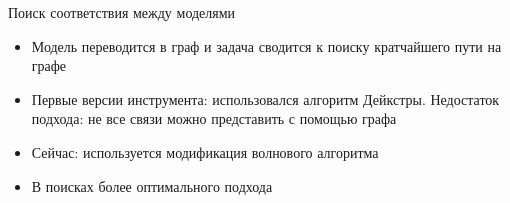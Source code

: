 \documentclass[12pt]{beamer}
\begin{document}
{
\begin{frame}[fragile]{Поиск соответствия между моделями}
  \begin{mybox}[]
  \begin{itemize}
  	\item Модель переводится в граф и задача сводится к поиску кратчайшего пути на графе
  	\item Первые версии инструмента: использовался алгоритм Дейкстры. Недостаток подхода: не все связи можно представить с помощью графа
  	\item Сейчас: используется модификация волнового алгоритма
  	\item В поисках более оптимального подхода
  \end{itemize}
  \end{mybox}
\end{frame}
}
\end{document}
